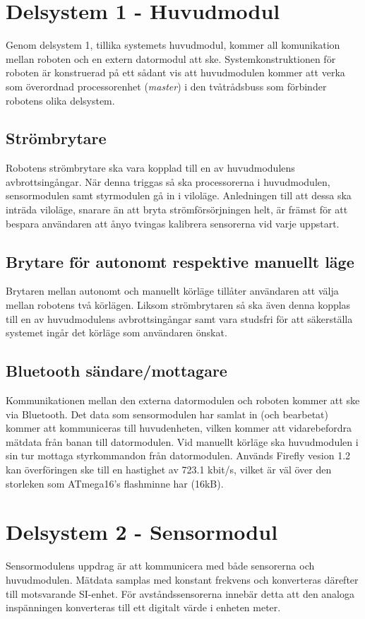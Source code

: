 \documentclass[11pt]{article}
\begin{document}
\begin{flushleft}
\pagebreak
\section{Delsystem 1 - Huvudmodul}
\label{sec:huvudmodul}
Genom delsystem 1, tillika systemets huvudmodul, kommer all komunikation mellan roboten och en extern datormodul att ske. Systemkonstruktionen för roboten är konstruerad på ett sådant vis att huvudmodulen kommer att verka som överordnad processorenhet (\emph{master}) i den tvåtrådsbuss som förbinder robotens olika delsystem. 
\subsection{Strömbrytare}
Robotens strömbrytare ska vara kopplad till en av huvudmodulens avbrottsingångar. När denna triggas så ska processorerna i huvudmodulen, sensormodulen samt styrmodulen gå in i viloläge. Anledningen till att dessa ska inträda viloläge, snarare än att bryta strömförsörjningen helt, är främst för att bespara användaren att ånyo tvingas kalibrera sensorerna vid varje uppstart.
\subsection{Brytare för autonomt respektive manuellt läge}
Brytaren mellan autonomt och manuellt körläge tillåter användaren att välja mellan robotens två körlägen. Liksom strömbrytaren så ska även denna kopplas till en av huvudmodulens avbrottsingångar samt vara studsfri för att säkerställa systemet ingår det körläge som användaren önskat.
\subsection{Bluetooth\textsuperscript{\circledR} sändare/mottagare} \label{bluetooth} 
Kommunikationen mellan den externa datormodulen och roboten kommer att ske via Bluetooth\textsuperscript{\circledR}. Det data som sensormodulen har samlat in (och bearbetat) kommer att kommuniceras till huvudenheten, vilken kommer att vidarebefordra mätdata från banan till datormodulen. Vid manuellt körläge ska huvudmodulen i sin tur mottaga styrkommandon från datormodulen. Används Firefly vesion 1.2 kan överföringen ske till en hastighet av 723.1 kbit/s, vilket är väl över den storleken som ATmega16's flashminne har (16kB).


\pagebreak
\section{Delsystem 2 - Sensormodul}
\label{sec:sensormodul}
Sensormodulens uppdrag är att kommunicera med både sensorerna och huvudmodulen. Mätdata samplas med konstant frekvens och konverteras därefter till motsvarande SI-enhet. För avståndssensorerna innebär detta att den analoga inspänningen konverteras till ett digitalt värde i enheten meter.


\end{flushleft}
\end{document}
